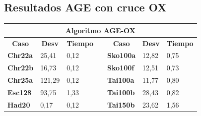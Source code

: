 \documentclass[a4paper, 12pt]{article}
\begin{document}
      \subsection{Resultados AGE con cruce OX}
      \begin{table}[H]
\centering
\label{my-label}
\begin{tabular}{|l|l|l|l|l|l|l|}
\hline
\multicolumn{7}{|c|}{\textbf{Algoritmo AGE-OX}}                                                                                                                                                                                                                   \\ \hline
\multicolumn{1}{|c|}{\textbf{Caso}} & \multicolumn{1}{c|}{\textbf{Desv}} & \multicolumn{1}{c|}{\textbf{Tiempo}} & \multicolumn{1}{c|}{\textbf{}} & \multicolumn{1}{c|}{\textbf{Caso}} & \multicolumn{1}{c|}{\textbf{Desv}} & \multicolumn{1}{c|}{\textbf{Tiempo}} \\ \cline{1-3} \cline{5-7} 
\textbf{Chr22a}                     & 25,41                              & 0,12                                 &                                & \textbf{Sko100a}                   & 12,82                              & 0,75                                 \\ \cline{1-3} \cline{5-7} 
\textbf{Chr22b}                     & 16,73                              & 0,12                                 &                                & \textbf{Sko100f}                   & 12,51                              & 0,73                                 \\ \cline{1-3} \cline{5-7} 
\textbf{Chr25a}                     & 121,29                             & 0,12                                 &                                & \textbf{Tai100a}                   & 11,77                              & 0,80                                 \\ \cline{1-3} \cline{5-7} 
\textbf{Esc128}                     & 93,75                              & 1,33                                 &                                & \textbf{Tai100b}                   & 28,43                              & 0,82                                 \\ \cline{1-3} \cline{5-7} 
\textbf{Had20}                      & 0,17                               & 0,12                                 &                                & \textbf{Tai150b}                   & 23,62                              & 1,56                                 \\ \cline{1-3} \cline{5-7} 

\end{tabular}
\end{table}
\end{document}
